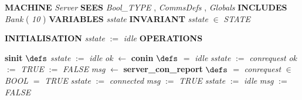 %
\bsetindent
\begin{tabbing}
\bSetTabs
%
%
\bbnl
{\bf MACHINE} \+ \bbnl
{\em Server\/} \-\label{Server}
%
%
\bbnl
{\bf SEES} \+ \bbnl
{\em Bool\_TYPE\/}\label{Bool_TYPE}  , {\em CommsDefs\/}\label{CommsDefs}  , {\em Globals\/}\label{Globals}  \-
%
%
\bbnl
{\bf INCLUDES} \+ \bbnl
{\em Bank\/}\label{Bank}  ( {\em 10\/} )  \-
%
%
\bbnl
{\bf VARIABLES} \+ \bbnl
{\em sstate\/}\label{sstate}  \-
%
%
\bbnl
{\bf INVARIANT} \+ \bbnl
{\em sstate\/} $\in$ {\em STATE\/}\label{STATE}
\end{tabbing}
\bresetindent
%
%
\vspace{-4.5ex}\bsetindent
\begin{tabbing}
\bSetTabs
\+\> \-
%
%
\bbnl
{\bf INITIALISATION} \+ \bbnl
{\em sstate\/} $:=$  {\em idle\/} \-
%
%
\bnl\bnl
{\bf OPERATIONS} \+ \bbnl

%
%
{\bf { sinit}}  \bhsp $\defs$ \+ \bnl
{\em sstate\/} $:=$  {\em idle\/} \- \bOperationSemiColon \bbnl
%
%
{\em ok\/} $\longleftarrow$  {\bf { conin}}  \bhsp $\defs$ \+ \bnl
   $=$ {\em idle\/} \- \bhsp {} \+\bnl
{\em sstate\/} $:=$  {\em conrequest\/} \bparallel \bnl
{\em ok\/} $:=$  {\em TRUE\/} \-\bnl
{}  $:=$  {\em FALSE\/} \-\bnl
{}  \- \bOperationSemiColon \bbnl
%
%
{\em msg\/} $\longleftarrow$  {\bf { server\_con\_report}}  \bhsp $\defs$ \+ \bnl
   $=$ {\em conrequest\/} \- \bhsp {} \+\bnl
{}  \-\bnl
{}  $\in$ {\em BOOL\/}\label{BOOL}  \- \bhsp {} \+\bnl
{}  $=$ {\em TRUE\/} \- \bhsp {} \+\bnl
{\em sstate\/} $:=$  {\em connected\/} \bparallel \bnl
{\em msg\/} $:=$  {\em TRUE\/} \-\bnl
{} \+\bnl
{\em sstate\/} $:=$  {\em idle\/} \bparallel \bnl
{\em msg\/} $:=$  {\em FALSE\/} \-\bnl
{}  \-\bnl
{}  \-\bnl
{}  \- \bOperationSemiColon 
\end{tabbing}
